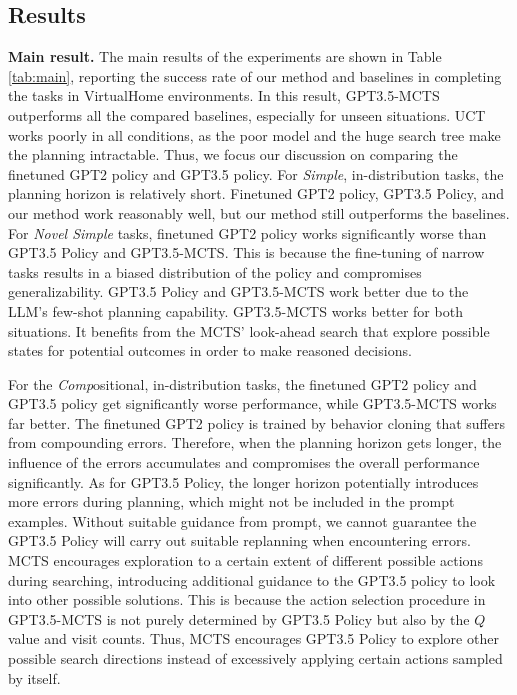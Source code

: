 
\subsection{Results}

\textbf{Main result.}
The main results of the experiments are shown in Table \ref{tab:main}, reporting the success rate of our method and baselines in completing the tasks in VirtualHome environments. In this result, GPT3.5-MCTS outperforms all the compared baselines, especially for unseen situations. UCT works poorly in all conditions, as the poor model and the huge search tree make the planning intractable. Thus, we focus our discussion on comparing the finetuned GPT2 policy and GPT3.5 policy. 
For \textit{Simple}, in-distribution tasks, the planning horizon is relatively short. Finetuned GPT2 policy, GPT3.5 Policy, and our method work reasonably well, but our method still outperforms the baselines. For \textit{Novel Simple} tasks, finetuned GPT2 policy works significantly worse than GPT3.5 Policy and GPT3.5-MCTS. This is because the fine-tuning of narrow tasks results in a biased distribution of the policy and compromises generalizability. GPT3.5 Policy and GPT3.5-MCTS work better due to the LLM's few-shot planning capability. GPT3.5-MCTS works better for both situations. It benefits from the MCTS' look-ahead search that explore possible states for potential outcomes in order to make reasoned decisions. 


For the \textit{Comp}ositional, in-distribution tasks, the finetuned GPT2 policy and GPT3.5 policy get significantly worse performance, while GPT3.5-MCTS works far better. The finetuned GPT2 policy is trained by behavior cloning that suffers from compounding errors. Therefore, when the planning horizon gets longer, the influence of the errors accumulates and compromises the overall performance significantly. As for GPT3.5 Policy, the longer horizon potentially introduces more errors during planning, which might not be included in the prompt examples. Without suitable guidance from prompt, we cannot guarantee the GPT3.5 Policy will carry out suitable replanning when encountering errors. MCTS encourages exploration to a certain extent of different possible actions during searching, introducing additional guidance to the GPT3.5 policy to look into other possible solutions. This is because the action selection procedure in GPT3.5-MCTS is not purely determined by GPT3.5 Policy but also by the $Q$ value and visit counts. Thus, MCTS encourages GPT3.5 Policy to explore other possible search directions instead of excessively applying certain actions sampled by itself.  




